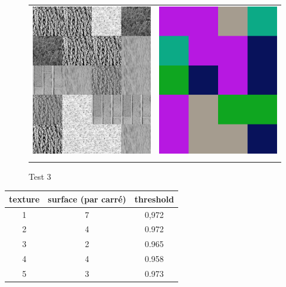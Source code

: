 
\begin{figure}[htbp]
\centering
\begin{tabular}{cc}
\centering
\includegraphics[width=6cm,]{Figures/chap3/texture3.png}
&
\includegraphics[width=6cm,]{Figures/chap3/texture3c.png}\\
&
\end{tabular}
\caption[test3]{Test 3\\}
\end{figure}

\begin{center}
\begin{tabular}{ | c c c | }
	\hline                       
	texture & surface (par carré) & threshold\\
	\hline                       
	  1 & 7 & 0,972    \\
	  2 & 4 & 0.972  \\
	  3 & 2 & 0.965  \\
  	  4 & 4 & 0.958 \\
	  5 & 3 & 0.973\\
	\hline                       
\end{tabular}
\end{center}


